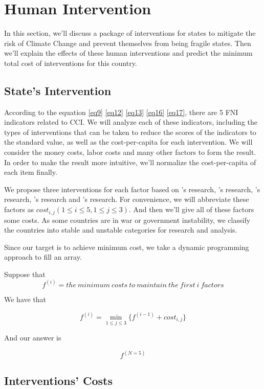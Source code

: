 \documentclass[a4paper,12pt]{article}
\begin{document}
\section{Human Intervention}

In this section, we'll discuss a package of interventions for states to mitigate the risk of Climate Change and prevent themselves from being fragile states. Then we'll explain the effects of these human interventions and predict the minimum total cost of interventions for this country.

\subsection{State's Intervention}

According to the equation \eqref{eq9} \eqref{eq12} \eqref{eq13} \eqref{eq16} \eqref{eq17}, there
are 5 FNI indicators related to CCI. We will analyze each of these indicators, including the types of interventions that can be taken to reduce the scores of the indicators to the standard value, as well as the cost-per-capita for each intervention. We will consider the money costs, labor costs and many other factors to form the result. In order to make the result more intuitive, we'll normalize the cost-per-capita of each item finally.

We propose three interventions for each factor based on \cite{hay2012security}'s research, 
\cite{Huang2017Rapid}'s research, \cite{Ocampo2006Uneven}'s research, \cite{Rossi2008Coupling}'s research and \cite{Kamungi2005Land}'s research. For convenience, we will abbreviate these factors as $cost_{i,j} ( 1\leq i\leq 5,1\leq j \leq 3 )$. And then we'll give all of these factors some costs. As some countries are in war or government instability, we classify the countries into stable and unstable categories for research and analysis.

Since our target is to achieve minimum cost, we take a dynamic programming approach to fill an array.

Suppose that
$$f^{(i)}=the~minimum~costs~to~maintain~the~first~i~factors$$

We have that

$$f^{(i)}=\min_{1\leq j \leq 3} \{f^{(i-1)}+cost_{i,j}\}$$

And our answer is

$$f^{(N=5)}$$


\subsection{Interventions' Costs}
\label{sec42}
\end{document}
